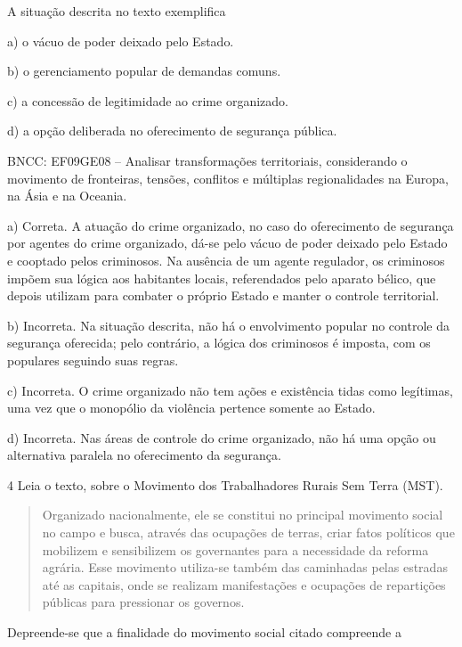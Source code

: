 A situação descrita no texto exemplifica

a)  o vácuo de poder deixado pelo Estado.

b)  o gerenciamento popular de demandas comuns.

c)  a concessão de legitimidade ao crime organizado.

d)  a opção deliberada no oferecimento de segurança pública.

BNCC: EF09GE08 -- Analisar transformações territoriais, considerando o movimento de fronteiras,
tensões, conflitos e múltiplas regionalidades na Europa, na Ásia e na Oceania.

a) Correta. A atuação do crime organizado, no caso do oferecimento de
segurança por agentes do crime organizado, dá-se pelo vácuo de poder
deixado pelo Estado e cooptado pelos criminosos. Na ausência de um
agente regulador, os criminosos impõem sua lógica aos habitantes locais,
referendados pelo aparato bélico, que depois utilizam para combater o
próprio Estado e manter o controle territorial.

b) Incorreta. Na situação descrita, não há o envolvimento popular no
controle da segurança oferecida; pelo contrário, a lógica dos criminosos
é imposta, com os populares seguindo suas regras.

c) Incorreta. O crime organizado não tem ações e existência tidas
como legítimas, uma vez que o monopólio da violência pertence somente ao
Estado.

d) Incorreta. Nas áreas de controle do crime organizado, não há uma
opção ou alternativa paralela no oferecimento da segurança.


\num{4} Leia o texto, sobre o Movimento dos Trabalhadores Rurais Sem Terra
(MST).

\begin{quote}
Organizado nacionalmente, ele se constitui no principal
movimento social no campo e busca, através das ocupações de terras,
criar fatos políticos que mobilizem e sensibilizem os governantes para a
necessidade da reforma agrária. Esse movimento utiliza-se também das
caminhadas pelas estradas até as capitais, onde se realizam
manifestações e ocupações de repartições públicas para pressionar os
governos.

\end{quote}

Depreende-se que a finalidade do movimento social citado compreende a

